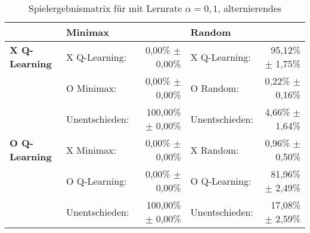 \begin{table}[ht]
\centering
\caption[Spielergebnismatrix \qlearning: $\alpha=0,1$, alternierendes \splay]{Spielergebnismatrix für \qlearning mit Lernrate $\alpha=0,1$, alternierendes \splay}
\label{tab:resultmatrix_ql_alternate_alpha01}

\begin{tabular}{llrlr}
\toprule
 & \multicolumn{2}{l}{\textbf{Minimax}} & \multicolumn{2}{l}{\textbf{Random}} \\ \midrule
\textbf{X Q-Learning}   & X Q-Learning:     & 0,00\% $\pm$    0,00\%            & X Q-Learning:         & 95,12\% $\pm$ 1,75\%  \\
                        & O Minimax:        & 0,00\% $\pm$    0,00\%            & O Random:             & 0,22\% $\pm$  0,16\%  \\
                        & Unentschieden:    & 100,00\% $\pm$  0,00\%            & Unentschieden:        & 4,66\% $\pm$  1,64\%  \\ \cmidrule{2-5}
\textbf{O Q-Learning}   & X Minimax:        & 0,00\% $\pm$    0,00\%            & X Random:             & 0,96\% $\pm$  0,50\%  \\
                        & O Q-Learning:     & 0,00\% $\pm$    0,00\%            & O Q-Learning:         & 81,96\% $\pm$ 2,49\%  \\
                        & Unentschieden:    & 100,00\% $\pm$  0,00\%            & Unentschieden:        & 17,08\% $\pm$ 2,59\%  \\ \bottomrule
\end{tabular}
\end{table}